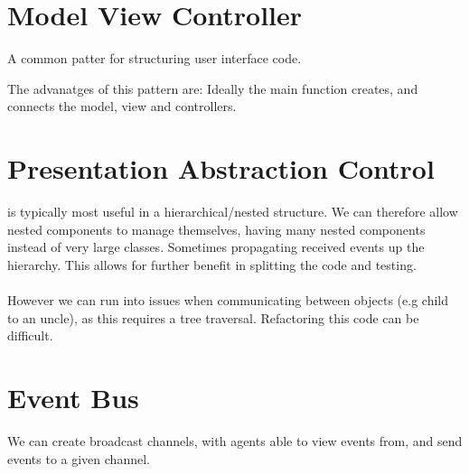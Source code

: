 \documentclass{report}
\begin{document}
\section*{Model View Controller}
A common patter for structuring user interface code.
\begin{itemize}
\end{itemize}
The advanatges of this pattern are:
Ideally the main function creates, and connects the model, view and controllers.
\section*{Presentation Abstraction Control}
 is typically most useful in a hierarchical/nested structure.
We can therefore allow nested components to manage themselves, having many nested components instead of very large classes. Sometimes propagating received events up the hierarchy.
This allows for further benefit in splitting the code and testing.
\\
\\ However we can run into issues when communicating between objects (e.g child to an uncle), as this requires a tree traversal. Refactoring this code can be difficult.
\section*{Event Bus}
We can create broadcast channels, with agents able to view events from, and send events to a given channel.
\end{document}
